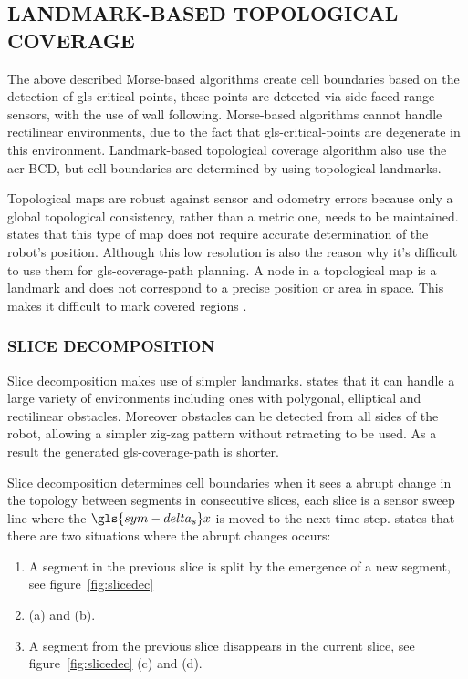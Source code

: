 \subsection{LANDMARK-BASED TOPOLOGICAL COVERAGE}
The above described Morse-based algorithms create cell boundaries based on the detection of \gls{gls-critical-point}s,
these points are detected via side faced range sensors, with the use of wall following. Morse-based algorithms cannot
handle rectilinear environments, due to the fact that \gls{gls-critical-point}s are degenerate in this environment.
Landmark-based topological coverage algorithm also use the \gls{acr-BCD}, but cell boundaries are determined by using
topological landmarks.

Topological maps are robust against sensor and odometry errors because only a global topological consistency, rather
than a metric one, needs to be maintained. \citet{thrun_learning_1998} states that this type of map does not require
accurate determination of the robot's position. Although this low resolution is also the reason why it's difficult to
use them for \gls{gls-coverage-path} planning. A node in a topological map is a landmark and does not correspond to a
precise position or area in space. This makes it difficult to mark covered regions \cite{wong_qualitative_2006}.

\subsubsection{SLICE DECOMPOSITION}\label{subsec:slicedecomp}
Slice decomposition makes use of simpler landmarks. \citet{galceran_survey_2013} states that it can handle a large
variety of environments including ones with polygonal, elliptical and rectilinear obstacles. Moreover obstacles can be
detected from all sides of the robot, allowing a simpler zig-zag pattern without retracting to be used. As a result the
generated \gls{gls-coverage-path} is shorter.

Slice decomposition determines cell boundaries when it sees a abrupt change in the topology between segments in
consecutive slices, each slice is a sensor sweep line where the \( \gls{sym-delta_s}  x \) is moved to the next time
step. \citeauthor{wong_complete_2004} states that there are two situations where the abrupt changes occurs:

\begin{enumerate}
    \item A segment in the previous slice is split by the emergence of a new segment, see figure~\ref{fig:slicedec} 
	\item (a) and (b).
    \item A segment from the previous slice disappears in the current slice, see figure~\ref{fig:slicedec} (c) and (d).
\end{enumerate}

